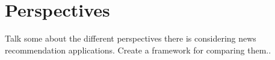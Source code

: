 \chapter{Perspectives}
Talk some about the different perspectives there is considering news recommendation applications. Create a framework for comparing them..
